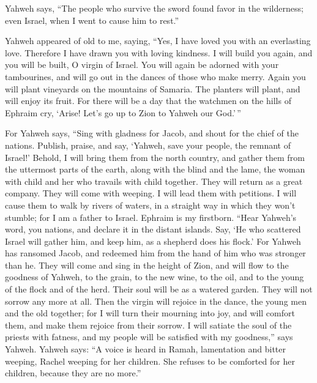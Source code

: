  Yahweh says, ``The people who survive the sword found
favor in the wilderness; even Israel, when I went to cause him to
rest.''

 Yahweh appeared of old to me, saying, ``Yes, I have loved
you with an everlasting love. Therefore I have drawn you with loving
kindness.  I will build you again, and you will be built,
O virgin of Israel. You will again be adorned with your tambourines, and
will go out in the dances of those who make merry.  Again
you will plant vineyards on the mountains of Samaria. The planters will
plant, and will enjoy its fruit.  For there will be a day
that the watchmen on the hills of Ephraim cry, `Arise! Let's go up to
Zion to Yahweh our God.'\,''

 For Yahweh says, ``Sing with gladness for Jacob, and
shout for the chief of the nations. Publish, praise, and say, `Yahweh,
save your people, the remnant of Israel!'  Behold, I will
bring them from the north country, and gather them from the uttermost
parts of the earth, along with the blind and the lame, the woman with
child and her who travails with child together. They will return as a
great company.  They will come with weeping. I will lead
them with petitions. I will cause them to walk by rivers of waters, in a
straight way in which they won't stumble; for I am a father to Israel.
Ephraim is my firstborn.  ``Hear Yahweh's word, you
nations, and declare it in the distant islands. Say, `He who scattered
Israel will gather him, and keep him, as a shepherd does his flock.'
 For Yahweh has ransomed Jacob, and redeemed him from the
hand of him who was stronger than he.  They will come and
sing in the height of Zion, and will flow to the goodness of Yahweh, to
the grain, to the new wine, to the oil, and to the young of the flock
and of the herd. Their soul will be as a watered garden. They will not
sorrow any more at all.  Then the virgin will rejoice in
the dance, the young men and the old together; for I will turn their
mourning into joy, and will comfort them, and make them rejoice from
their sorrow.  I will satiate the soul of the priests
with fatness, and my people will be satisfied with my goodness,'' says
Yahweh.  Yahweh says: ``A voice is heard in Ramah,
lamentation and bitter weeping, Rachel weeping for her children. She
refuses to be comforted for her children, because they are no more.''

